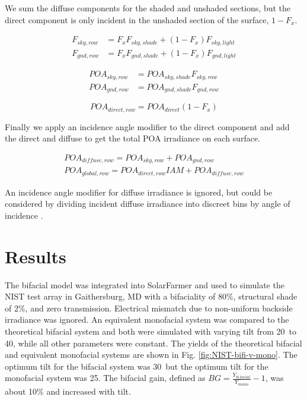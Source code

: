 \documentclass[conference]{IEEEtran}
\begin{document}
We sum the diffuse components for the shaded and unshaded sections, but the direct component is only incident in the unshaded section of the surface, $1-F_x$.

\begin{align}
F_{sky,row} &= F_xF_{sky,shade}+\left(1-F_x\right)F_{sky,light}\\
F_{gnd,row} &= F_xF_{gnd,shade}+\left(1-F_x\right)F_{gnd,light}
\end{align}

\begin{align}
POA_{sky,row} &= POA_{sky,shade}F_{sky,row}\\
POA_{gnd,row} &= POA_{gnd,shade}F_{gnd,row}
\end{align}

\begin{equation}
POA_{direct,row} = POA_{direct}\left(1-F_x\right)
\end{equation}

Finally we apply an incidence angle modifier to the direct component and add the direct and diffuse to get the total POA irradiance on each surface.

\begin{align}
POA_{diffuse,row} = POA_{sky,row} + POA_{gnd,row}\\
POA_{global,row} = POA_{direct,row}IAM + POA_{diffuse,row}
\end{align}

An incidence angle modifier for diffuse irradiance is ignored, but could be considered by dividing incident diffuse irradiance into discreet bins by angle of incidence \cite{Marion2017}.

\section{Results}
The bifacial model was integrated into SolarFarmer \cite{Mikofski_8547323} and used to simulate the NIST test array in Gaithersburg, MD \cite{Boyd2017,Boyd2017a,Boyd2017b} with a bifaciality of 80\%, structural shade of 2\%, and zero transmission.  Electrical mismatch due to non-uniform backside irradiance was ignored.  An equivalent monofacial system was compared to the theoretical bifacial system and both were simulated with varying tilt from 20\degree\ to 40\degree, while all other parameters were constant.  The yields of the theoretical bifacial and equivalent monofacial systems are shown in Fig. \ref{fig:NIST-bifi-v-mono}.  The optimum tilt for the bifacial system was 30\degree\, but the optimum tilt for the monofacial system was 25\degree.  The bifacial gain, defined as $BG=\frac{Y_{bifacial}}{Y_{mono}}-1$, was about 10\% and increased with tilt.
\end{document}
